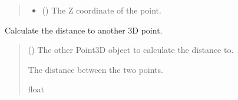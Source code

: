 \documentclass[a4paper,10pt,english]{sphinxmanual}
\begin{document}
\begin{fulllineitems}
\begin{quote}
\begin{description}
\begin{itemize}
\item {} 
\sphinxAtStartPar
{} (\sphinxstyleliteralemphasis{\sphinxupquote{, }}\sphinxstyleliteralemphasis{\sphinxupquote{, }}) \textendash{} The Z coordinate of the point.

\end{itemize}

\end{description}\end{quote}

\begin{fulllineitems}
\label{\detokenize{API:pyacad.APoint.APoint.distance_to}}
\pysigstartsignatures
{}
\pysigstopsignatures
\sphinxAtStartPar
Calculate the distance to another 3D point.
\begin{quote}\begin{description}
\sphinxAtStartPar
{} () \textendash{} The other Point3D object to calculate the distance to.

\sphinxAtStartPar
The distance between the two points.

\sphinxAtStartPar
float

\end{description}\end{quote}

\end{fulllineitems}


\end{fulllineitems}

\end{document}
